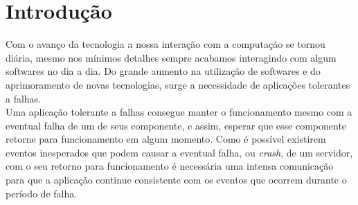 \documentclass[12pt,
openright, 
oneside,
a4paper,
brazil]{facom-ufu-abntex2}
\begin{document}
\imprimircapa
\imprimirfolhaderosto






\begin{siglas}
\end{siglas}


\tableofcontents*
\cleardoublepage


\textual

\chapter{Introdução}
Com o avanço da tecnologia a nossa interação com a computação se tornou diária, mesmo
nos mínimos detalhes sempre acabamos interagindo com algum softwares no dia a dia. Do
grande aumento na utilização de softwares e do aprimoramento de novas tecnologias, surge
a necessidade de aplicações tolerantes a falhas. \\

Uma aplicação tolerante a falhas consegue manter o funcionamento mesmo com a eventual 
falha de um de seus componente, e assim, esperar que esse componente retorne para 
funcionamento em algum momento. Como é possível existirem eventos inesperados que podem
causar a eventual falha, ou \textit{crash}, de um servidor, com o seu retorno para 
funcionamento é necessária uma intensa comunicação para que a aplicação continue
consistente com os eventos que ocorrem durante o período de falha.\\
\end{document}
